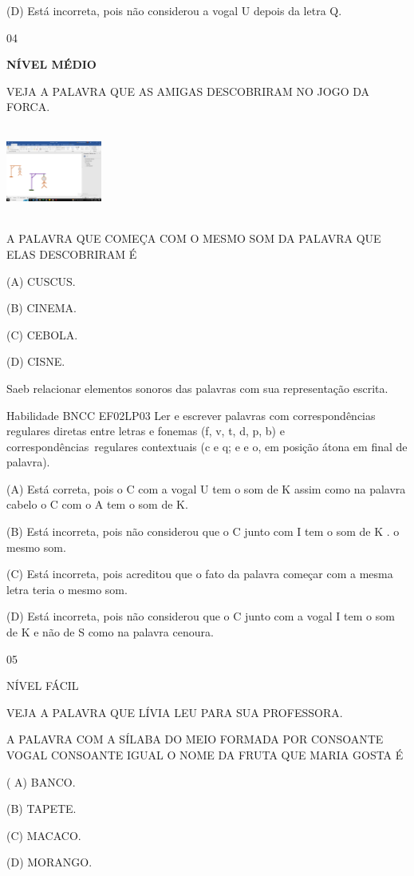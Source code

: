 {{(D) Está incorreta, pois não considerou a vogal U depois da letra Q.

\num{04}

\textbf{NÍVEL MÉDIO}

VEJA A PALAVRA QUE AS AMIGAS DESCOBRIRAM NO JOGO DA FORCA.

\includegraphics[width=1.24236in,height=1.17500in]{media/image166.png}

A PALAVRA QUE COMEÇA COM O MESMO SOM DA PALAVRA QUE ELAS DESCOBRIRAM É

(A) CUSCUS.

(B) CINEMA.

(C) CEBOLA.

(D) CISNE.

Saeb relacionar elementos sonoros das palavras com sua representação
escrita.

Habilidade BNCC EF02LP03 Ler e escrever palavras com correspondências
regulares diretas entre letras e fonemas (f, v, t, d, p, b) e
correspondências~regulares contextuais (c e q; e e o, em posição átona
em final de palavra).

(A) Está correta, pois o C com a vogal U tem o som de K assim como na
palavra cabelo o C com o A tem o som de K.

(B) Está incorreta, pois não considerou que o C junto com I tem o som de
K . o mesmo som.

(C) Está incorreta, pois acreditou que o fato da palavra começar com a
mesma letra teria o mesmo som.

(D) Está incorreta, pois não considerou que o C junto com a vogal I tem
o som de K e não de S como na palavra cenoura.

\num{05}

NÍVEL FÁCIL

VEJA A PALAVRA QUE LÍVIA LEU PARA SUA PROFESSORA.

A PALAVRA COM A SÍLABA DO MEIO FORMADA POR CONSOANTE VOGAL CONSOANTE
IGUAL O NOME DA FRUTA QUE MARIA GOSTA É

( A) BANCO.

(B) TAPETE.

(C) MACACO.

(D) MORANGO.

}}
